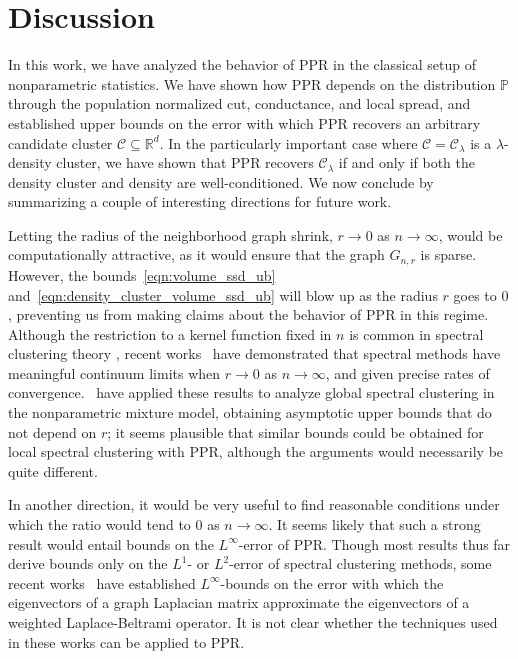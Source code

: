 \documentclass[twoside,11pt]{article}
\newcommand{\Reals}{\mathbb{R}}
\newcommand{\1}{\mathbf{1}}
\newcommand{\Rd}{\Reals^d}
\newcommand{\Leb}{L}
\newcommand{\mc}[1]{\mathcal{#1}}
\newcommand{\Pbb}{\mathbb{P}}
\newcommand{\wh}[1]{\widehat{#1}}
\newcommand{\vol}{\mathrm{vol}}
\begin{document}
\section{Discussion}
\label{sec:discussion}
In this work, we have analyzed the behavior of PPR in the classical setup of nonparametric statistics. We have shown how PPR depends on the distribution $\Pbb$ through the population normalized cut, conductance, and local spread, and established upper bounds on the error with which PPR recovers an arbitrary candidate cluster $\mc{C} \subseteq \Rd$.  In the particularly important case where $\mc{C} = \mc{C}_{\lambda}$ is a $\lambda$-density cluster, we have shown that PPR recovers $\mc{C}_{\lambda}$ if and only if both the density cluster and density are well-conditioned. We now conclude by summarizing a couple of interesting directions for future work.

Letting the radius of the neighborhood graph shrink, $r \to 0$ as $n \to \infty$, would be computationally attractive, as it would ensure that the graph $G_{n,r}$ is sparse. However, the bounds~\eqref{eqn:volume_ssd_ub} and~\eqref{eqn:density_cluster_volume_ssd_ub} will blow up as the radius $r$ goes to $0$, preventing us from making claims about the behavior of PPR in this regime. Although the restriction to a kernel function fixed in $n$ is common in spectral clustering theory \citep{vonluxburg2008, schiebinger2015, singer2017}, recent works~\citep{shi2015, calder2019, garciatrillos18, garciatrillos2020, yuan2020} have demonstrated that spectral methods have meaningful continuum limits when $r \to 0$ as $n \to \infty$, and given precise rates of convergence.~\cite{garciatrillos19} have applied these results to analyze global spectral clustering in the nonparametric mixture model, obtaining asymptotic upper bounds that do not depend on $r$; it seems plausible that similar bounds could be obtained for local spectral clustering with PPR, although the arguments would necessarily be quite different.

In another direction, it would be very useful to find reasonable conditions under which the ratio \smash{$\Delta(\wh{C},\mc{C}[X])/\vol_{n,r}(\mc{C}[X])$} would tend to $0$ as $n \to \infty$. It seems likely that such a strong result would entail bounds on the $\Leb^{\infty}$-error of PPR. Though most results thus far derive bounds only on the $\Leb^1$- or $\Leb^2$-error of spectral clustering methods, some recent works~\citep{dunson2020,calder2020} have established $\Leb^{\infty}$-bounds on the error with which the eigenvectors of a graph Laplacian matrix approximate the eigenvectors of a weighted Laplace-Beltrami operator. It is not clear whether the techniques used in these works can be applied to PPR.
\end{document}
